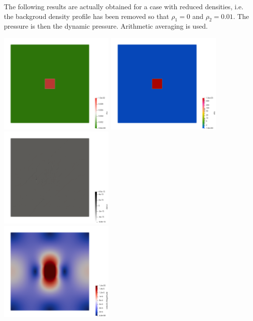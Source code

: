 The following results are actually obtained for a case with reduced 
densities, i.e. the backgroud density profile has been removed so that 
$\rho_1=0$ and $\rho_2=0.01$. The pressure is then the dynamic pressure.
Arithmetic averaging is used.

\begin{center}
\includegraphics[width=5.7cm]{python_codes/fieldstone_158/results/exp5/rho}
\includegraphics[width=5.7cm]{python_codes/fieldstone_158/results/exp5/eta}
\includegraphics[width=5.7cm]{python_codes/fieldstone_158/results/exp5/divv}\\
\includegraphics[width=5.7cm]{python_codes/fieldstone_158/results/exp5/vel}

\end{center}
